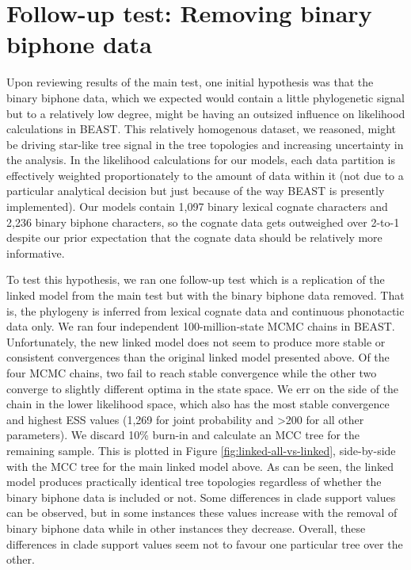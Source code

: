 \documentclass[]{article}
\begin{document}
\hypertarget{follow-up-test}{%
\section{Follow-up test: Removing binary biphone data}\label{follow-up-test}}

Upon reviewing results of the main test, one initial hypothesis was that the binary biphone data, which we expected would contain a little phylogenetic signal but to a relatively low degree, might be having an outsized influence on likelihood calculations in BEAST. This relatively homogenous dataset, we reasoned, might be driving star-like tree signal in the tree topologies and increasing uncertainty in the analysis. In the likelihood calculations for our models, each data partition is effectively weighted proportionately to the amount of data within it (not due to a particular analytical decision but just because of the way BEAST is presently implemented). Our models contain 1,097 binary lexical cognate characters and 2,236 binary biphone characters, so the cognate data gets outweighed over 2-to-1 despite our prior expectation that the cognate data should be relatively more informative.

To test this hypothesis, we ran one follow-up test which is a replication of the linked model from the main test but with the binary biphone data removed. That is, the phylogeny is inferred from lexical cognate data and continuous phonotactic data only. We ran four independent 100-million-state MCMC chains in BEAST. Unfortunately, the new linked model does not seem to produce more stable or consistent convergences than the original linked model presented above. Of the four MCMC chains, two fail to reach stable convergence while the other two converge to slightly different optima in the state space. We err on the side of the chain in the lower likelihood space, which also has the most stable convergence and highest ESS values (1,269 for joint probability and \textgreater{}200 for all other parameters). We discard 10\% burn-in and calculate an MCC tree for the remaining sample. This is plotted in Figure \ref{fig:linked-all-vs-linked}, side-by-side with the MCC tree for the main linked model above. As can be seen, the linked model produces practically identical tree topologies regardless of whether the binary biphone data is included or not. Some differences in clade support values can be observed, but in some instances these values increase with the removal of binary biphone data while in other instances they decrease. Overall, these differences in clade support values seem not to favour one particular tree over the other.
\end{document}
